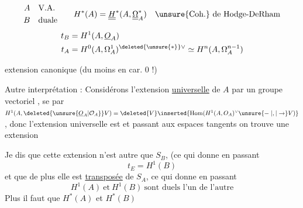 \[
\begin{aligned}
 A&\quad\text{V.A.}\\
 B&\quad\text{duale}
\end{aligned}
\qquad
 H^*(A)=\underline{\underline{H}}^*(A,\underline{\underline{\Omega}}_A^*)
 \quad\text{\unsure{Coh.} de Hodge-DeRham}
\]
\[
\begin{aligned}
 t_B&=H^1(A,\underline{O}_A)\\
 t_A&=H^0(A,\Omega_A^1)^{\deleted{\unsure{*}}\vee}\simeq H^n(A,\Omega_A^{n-1})
\end{aligned}
\]

extension canonique (du moins en car. 0 !)

Autre interprétation : Considérons l'extension \uline{universelle} de $A$ par un groupe vectoriel ,   se   par $H^1(A,\deleted{\unsure{\underline{O}_A|\mathcal{O}_A}}V)=\deleted{V}\inserted{\operatorname{Hom}(H^1(A,O_A)^\vee\unsure{\relbar|,|\to}V)}$, donc l'extension universelle est
et passant aux espaces tangents on trouve une extension

Je dis que cette extension n'est autre que $S_B$, (ce qui donne en passant
\[
 t_E=H^1(B) \tag*{)}
\]
et que de plus elle est \uline{transposée} de $S_A$, ce qui donne en passant
\[
 \boxed{H^1(A)\ \text{et}\ H^1(B)\ \text{sont duels l'un de l'autre}}
\]
\margin{$\Vert$}Plus  il faut  que $H^*(A)$ et $H^*(B)$
